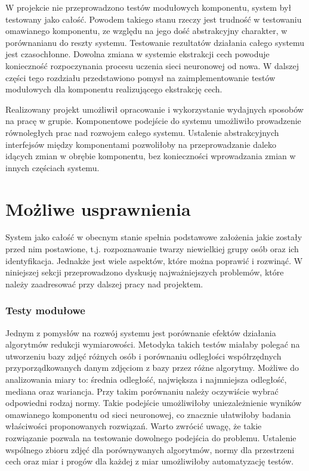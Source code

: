 \documentclass[oneside, eng]{mgr}
\begin{document}
W projekcie nie przeprowadzono testów modułowych komponentu, system był testowany jako całość. Powodem takiego stanu rzeczy jest trudność w testowaniu omawianego komponentu, ze względu na jego dość abstrakcyjny charakter, w porównanianu do reszty systemu. Testowanie rezultatów działania całego systemu jest czasochłonne. Dowolna zmiana w systemie ekstrakcji cech powoduje konieczność rozpoczynania procesu uczenia sieci neuronowej od nowa. W dalszej części tego rozdziału przedstawiono pomysł na zaimplementowanie testów modułowych dla komponentu realizującego ekstrakcję cech.

Realizowany projekt umożliwił opracowanie i wykorzystanie wydajnych sposobów na pracę w grupie. Komponentowe podejście do systemu umożliwiło prowadzenie równoległych prac nad rozwojem całego systemu. Ustalenie abstrakcyjnych interfejsów między komponentami pozwoliłoby na przeprowadzanie daleko idących zmian w obrębie komponentu, bez konieczności wprowadzania zmian w innych częściach systemu.

\section{Możliwe usprawnienia}

System jako całość w obecnym stanie spełnia podstawowe założenia jakie zostały przed nim postawione, t.j. rozpoznawanie twarzy niewielkiej grupy osób oraz ich identyfikacja. Jednakże jest wiele aspektów, które można poprawić i rozwinąć. W niniejszej sekcji przeprowadzono dyskusję najważniejszych problemów, które należy zaadresować przy dalszej pracy nad projektem.

\subsubsection{Testy modułowe}

Jednym z pomysłów na rozwój systemu jest porównanie efektów działania algorytmów redukcji wymiarowości. Metodyka takich testów miałaby polegać na utworzeniu bazy zdjęć różnych osób i porównaniu odległości współrzędnych przyporządkowanych danym zdjęciom z bazy przez różne algorytmy. Możliwe do analizowania miary to: średnia odległość, największa i najmniejsza odległość, mediana oraz wariancja. Przy takim porównaniu należy oczywiście wybrać odpowiedni rodzaj normy. Takie podejście umożliwiłoby uniezależnienie wyników omawianego komponentu od sieci neuronowej, co znacznie ułatwiłoby badania właściwości proponowanych rozwiązań. Warto zwrócić uwagę, że takie rozwiązanie pozwala na testowanie dowolnego podejścia do problemu. Ustalenie wspólnego zbioru zdjęć dla porównywanych algorytmów, normy dla przestrzeni cech oraz miar i progów dla każdej z miar umożliwiłoby automatyzację testów.
\end{document}
